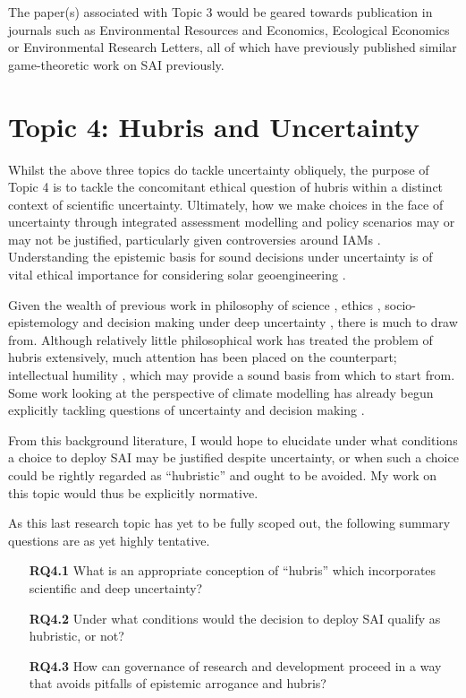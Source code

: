 \documentclass{article}
\begin{document}
The paper(s) associated with Topic 3 would be geared towards publication in journals such as Environmental Resources and Economics, Ecological Economics or Environmental Research Letters, all of which have previously published similar game-theoretic work on SAI previously.
\clearpage
\section*{Topic 4: Hubris and Uncertainty}
Whilst the above three topics do tackle uncertainty obliquely, the purpose of Topic 4 is to tackle the concomitant ethical question of hubris within a distinct context of scientific uncertainty. Ultimately, how we make choices in the face of uncertainty through integrated assessment modelling and policy scenarios may or may not be justified, particularly given controversies around IAMs \citep{pindyck2013climate,keen2020appallingly,pezzey2019social}. Understanding the epistemic basis for sound decisions under uncertainty is of vital ethical importance for considering solar geoengineering \citep{NAP2021}. \medskip

Given the wealth of previous work in philosophy of science \citep{carnap2012introduction}, ethics \citep{tannert2007ethics}, socio-epistemology \citep{morrison2021models} and decision making under deep uncertainty \citep{marchau2019decision}, there is much to draw from. Although relatively little philosophical work has treated the problem of hubris extensively, much attention has been placed on the counterpart; intellectual humility \citep{church2016doxastic,hazlett2012higher}, which may provide a sound basis from which to start from. 
Some work looking at the perspective of climate modelling has already begun explicitly tackling questions of uncertainty and decision making \citep{helgeson2020structuring, hill2016climate}. \medskip

From this background literature, I would hope to elucidate under what conditions a choice to deploy SAI may be justified despite uncertainty, or when such a choice could be rightly regarded as ``hubristic'' and ought to be avoided. My work on this topic would thus be explicitly normative. \medskip

As this last research topic has yet to be fully scoped out, the following summary questions are as yet highly tentative.

\begin{enumerate}
    \item[\textbf{RQ4.1}] What is an appropriate conception of ``hubris'' which incorporates scientific and deep uncertainty?
    \item[\textbf{RQ4.2}] Under what conditions would the decision to deploy SAI qualify as hubristic, or not?
    \item[\textbf{RQ4.3}] How can governance of research and development proceed in a way that avoids pitfalls of epistemic arrogance and hubris?
\end{enumerate}
\end{document}
